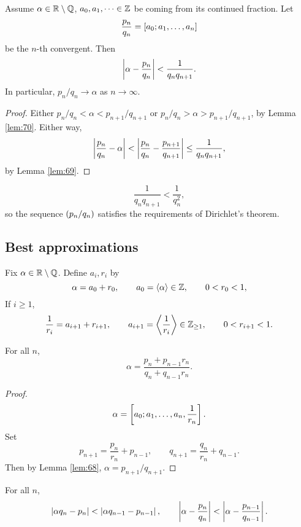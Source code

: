 \begin{corollary}
Assume $ \alpha \in \R \setminus \Q $, $ a_0, a_1, \dots \in \Z $ be coming from its continued fraction. Let
$$ \dfrac{p_n}{q_n} = \sb{a_0; a_1, \dots, a_n} $$
be the $ n $-th convergent. Then
$$ \abs{\alpha - \dfrac{p_n}{q_n}} < \dfrac{1}{q_nq_{n + 1}}. $$
In particular, $ p_n / q_n \to \alpha $ as $ n \to \infty $.
\end{corollary}

\begin{proof}
Either $ p_n / q_n < \alpha < p_{n + 1} / q_{n + 1} $ or $ p_n / q_n > \alpha > p_{n + 1} / q_{n + 1} $, by Lemma \ref{lem:70}. Either way,
$$ \abs{\dfrac{p_n}{q_n} - \alpha} < \abs{\dfrac{p_n}{q_n} - \dfrac{p_{n + 1}}{q_{n + 1}}} \le \dfrac{1}{q_nq_{n + 1}}, $$
by Lemma \ref{lem:69}.
\end{proof}

\begin{note*}
$$ \dfrac{1}{q_nq_{n + 1}} < \dfrac{1}{q_n^2}, $$
so the sequence $ \rb{p_n / q_n} $ satisfies the requirements of Dirichlet's theorem.
\end{note*}

\subsection{Best approximations}

Fix $ \alpha \in \R \setminus \Q $. Define $ a_i, r_i $ by
$$ \alpha = a_0 + r_0, \qquad a_0 = \fb{\alpha} \in \Z, \qquad 0 < r_0 < 1, $$
If $ i \ge 1 $,
$$ \dfrac{1}{r_i} = a_{i + 1} + r_{i + 1}, \qquad a_{i + 1} = \fb{\dfrac{1}{r_i}} \in \Z_{\ge 1}, \qquad 0 < r_{i + 1} < 1. $$

\begin{lemma}
\label{lem:72}
For all $ n $,
$$ \alpha = \dfrac{p_n + p_{n - 1}r_n}{q_n + q_{n - 1}r_n}. $$
\end{lemma}

\begin{proof}
$$ \alpha = \sb{a_0; a_1, \dots, a_n, \dfrac{1}{r_n}}. $$
Set
$$ p_{n + 1} = \dfrac{p_n}{r_n} + p_{n - 1}, \qquad q_{n + 1} = \dfrac{q_n}{r_n} + q_{n - 1}. $$
Then by Lemma \ref{lem:68}, $ \alpha = p_{n + 1} / q_{n + 1} $.
\end{proof}

\begin{corollary}
For all $ n $,
$$ \abs{\alpha q_n - p_n} < \abs{\alpha q_{n - 1} - p_{n - 1}}, \qquad \abs{\alpha - \dfrac{p_n}{q_n}} < \abs{\alpha - \dfrac{p_{n - 1}}{q_{n - 1}}}. $$
\end{corollary}


